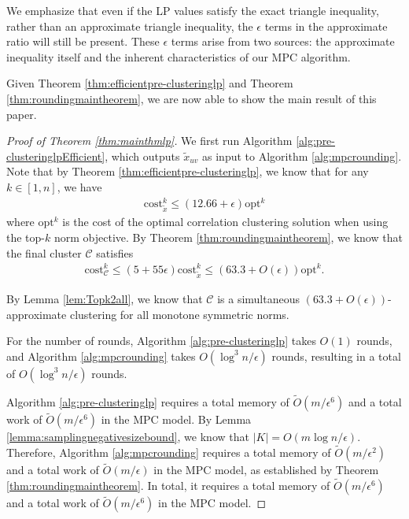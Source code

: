 \documentclass[11pt]{article}
\newcommand{\cost}{\mathrm{cost}}
\newcommand{\calC}{{\mathcal{C}}}
\newcommand{\opt}{{\mathrm{opt}}}
\begin{document}
\begin{CJK*}{UTF8}{gbsn}
\thmroundingmain*

We emphasize that even if the LP values satisfy the exact triangle inequality, rather than an approximate triangle inequality, the $\epsilon$ terms in the approximate ratio will still be present. These $\epsilon$ terms arise from two sources: the approximate inequality itself and the inherent characteristics of our MPC algorithm.

Given Theorem \ref{thm:efficientpre-clusteringlp} and Theorem \ref{thm:roundingmaintheorem}, we are now able to show the main result of this paper.

\begin{proof}[Proof of Theorem \ref{thm:mainthmlp}]
We first run Algorithm \ref{alg:pre-clusteringlpEfficient}, which outputs $\tilde{x}_{uv}$ as input to Algorithm \ref{alg:mpcrounding}. Note that by Theorem \ref{thm:efficientpre-clusteringlp}, we know that for any $k \in [1, n]$, we have 
\begin{align*}
    \cost^k_{\tilde{x}} \leq (12.66 + \epsilon) \opt^k
\end{align*}
where $\opt^k$ is the cost of the optimal correlation clustering solution when using the top-$k$ norm objective. By Theorem \ref{thm:roundingmaintheorem}, we know that the final cluster $\calC$ satisfies
\begin{align*}
    \cost^k_\calC \leq (5 + 55\epsilon) \cost^k_{\tilde{x}} \leq (63.3 + O(\epsilon)) \opt^k.
\end{align*}

By Lemma \ref{lem:Topk2all}, we know that $\calC$ is a simultaneous $(63.3 + O(\epsilon))$-approximate clustering for all monotone symmetric norms.

For the number of rounds, Algorithm \ref{alg:pre-clusteringlp} takes $O(1)$ rounds, and Algorithm \ref{alg:mpcrounding} takes $O(\log^3 n / \epsilon)$ rounds, resulting in a total of $O(\log^3 n / \epsilon)$ rounds.

Algorithm \ref{alg:pre-clusteringlp} requires a total memory of $\tilde{O}(m / \epsilon^6)$ and a total work of $\tilde{O}(m / \epsilon^6)$ in the MPC model. By Lemma \ref{lemma:samplingnegativesizebound}, we know that $|K| = O(m \log n / \epsilon)$. Therefore, Algorithm \ref{alg:mpcrounding} requires a total memory of $\tilde{O}(m / \epsilon^2)$ and a total work of $\tilde{O}(m / \epsilon)$ in the MPC model, as established by Theorem \ref{thm:roundingmaintheorem}. In total, it requires a total memory of $\tilde{O}(m / \epsilon^6)$ and a total work of $\tilde{O}(m / \epsilon^6)$ in the MPC model.
\end{proof}




\end{CJK*}
\end{document}

